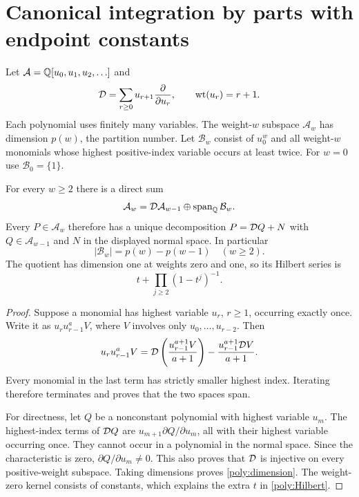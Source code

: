 \section{Canonical integration by parts with endpoint constants}
\label{poly:normalform}

Let $\mathcal A=\mathbb Q[u_0,u_1,u_2,\ldots]$ and
\[
 \mathcal D=\sum_{r\ge0}u_{r+1}\frac{\partial}{\partial u_r},\qquad
 \operatorname{wt}(u_r)=r+1.
\]
Each polynomial uses finitely many variables. The weight-$w$ subspace
$\mathcal A_w$ has dimension $p(w)$, the partition number.
Let $\mathcal B_w$ consist of $u_0^w$ and all weight-$w$ monomials
whose highest positive-index variable occurs at least twice.
For $w=0$ use $\mathcal B_0=\{1\}$.

\begin{theorem}
\label{poly:IBP}
For every $w\ge2$ there is a direct sum
\begin{equation}\label{poly:directsum}
 \mathcal A_w=\mathcal D\mathcal A_{w-1}\oplus
                      \operatorname{span}_{\mathbb Q}\mathcal B_w.
\end{equation}
Every $P\in\mathcal A_w$ therefore has a unique decomposition
$P=\mathcal D Q+N$ with $Q\in\mathcal A_{w-1}$ and $N$ in the displayed normal space. In particular
\begin{equation}\label{poly:dimension}
 |\mathcal B_w|=p(w)-p(w-1)\quad(w\ge2).
\end{equation}
The quotient has dimension one at weights zero and one, so its
Hilbert series is
\begin{equation}\label{poly:Hilbert}
 t+\prod_{j\ge2}(1-t^j)^{-1}.
\end{equation}
\end{theorem}

\begin{proof}
Suppose a monomial has highest variable $u_r$, $r\ge1$, occurring
exactly once. Write it as $u_r u_{r-1}^a V$, where $V$ involves
only $u_0,\ldots,u_{r-2}$. Then
\begin{equation}\label{poly:IBPstep}
 u_r u_{r-1}^aV=
 \mathcal D\left(\frac{u_{r-1}^{a+1}V}{a+1}\right)
 -\frac{u_{r-1}^{a+1}\mathcal D V}{a+1}.
\end{equation}
Every monomial in the last term has strictly smaller highest index.
Iterating therefore terminates and proves that the two spaces span.

For directness, let $Q$ be a nonconstant polynomial with highest
variable $u_m$. The highest-index terms of $\mathcal D Q$ are
$u_{m+1}\partial Q/\partial u_m$, all with their highest variable
occurring once. They cannot occur in a polynomial in the normal space.
Since the characteristic is zero, $\partial Q/\partial u_m\ne0$.
This also proves that $\mathcal D$ is injective on every positive-weight
subspace. Taking dimensions proves \eqref{poly:dimension}.
The weight-zero kernel consists of constants, which explains the extra
$t$ in \eqref{poly:Hilbert}.
\end{proof}

